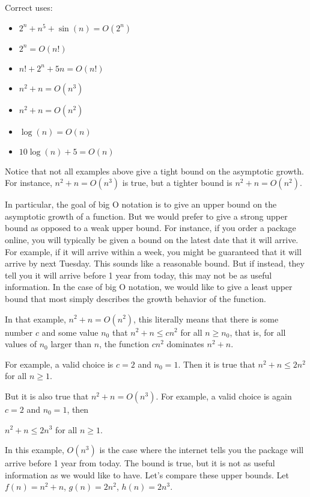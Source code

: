 \documentclass[../open-optimization/open-optimization.tex]{subfiles}
\begin{document}
Correct uses:
\begin{itemize}
\item $2^n + n^5 + \sin(n) = O(2^n)$
\item $2^n = O(n!)$
\item $n! + 2^n + 5n = O(n!)$
\item $n^2 + n = O(n^3)$
\item $n^2 + n = O(n^2)$
\item $\log(n) = O(n)$
\item $10 \log(n) + 5 = O(n)$
\end{itemize}
Notice that not all examples above give a tight bound on the asymptotic growth.  For instance, $n^2 + n = O(n^3)$ is true, but a tighter bound is $n^2 + n = O(n^2)$.  

In particular, the goal of big O notation is to give an upper bound on the asymptotic growth of a function.  
But we would prefer to give a strong upper bound as opposed to a weak upper bound.
For instance, if you order a package online, you will typically be given a bound on the latest date that it will arrive.  For example, if it will arrive within a week, you might be guaranteed that it will arrive by next Tuesday.  This sounds like a reasonable bound.  But if instead, they tell you it will arrive before 1 year from today, this may not be as useful information.
In the case of big O notation, we would like to give a least upper bound that most simply describes the growth behavior of the function.

In that example,  
$n^2 + n = O(n^2)$, this literally means that 
there is some number $c$ and some value $n_0$ that 
$n^2 + n \leq c n^2$ for all $n \geq n_0$, 
that is, for all values of $n_0$ larger than $n$, the function $c n^2$ dominates $n^2 + n$.  

For example, a valid choice is $c = 2$ and $n_0 = 1$.  Then it is true that 
$n^2 + n \leq 2 n^2$ for all $n \geq 1$.



But it is also true that $n^2 + n = O(n^3)$.  For example, a valid choice is again $c = 2$ and $n_0 = 1$, then 

$n^2 + n \leq 2 n^3$ for all $n \geq 1$.

In this example, $O(n^3)$ is the case where the internet tells you the package will arrive before 1 year from today.    The bound is true, but it is not as useful information as we would like to have.
Let's compare these upper bounds.  
Let $f(n) = n^2 + n$,
 $g(n) = 2n^2$,
$h(n) = 2n^3$.
\end{document}
